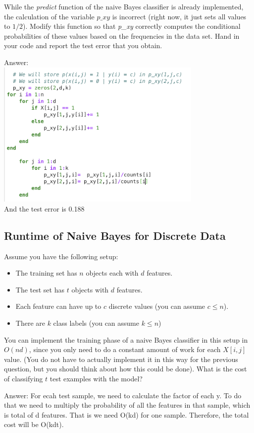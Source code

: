 \documentclass{article}
\def\ans#1{\par\gre{Answer: #1}}
\def\blu#1{{\color{blu}#1}}
\def\gre#1{{\color{gre}#1}}
\def\items#1{\begin{itemize}#1\end{itemize}}
\begin{document}
While the \emph{predict} function of the naive Bayes classifier is already implemented, the calculation of the variable $p\_xy$ is incorrect (right now, it just sets all values to $1/2$). \blu{Modify this function so that \emph{p\_xy} correctly computes the conditional probabilities of these values based on the frequencies in the data set. Hand in your code and report the test error that you obtain.}
\ans{\\ \includegraphics[width = 10cm]{Q2Code2.png}
\\
And the test error is 0.188}

\subsection{Runtime of Naive Bayes for Discrete Data}

Assume you have the following setup:
\items{
\item The training set has $n$ objects each with $d$ features.
\item The test set has $t$ objects with $d$ features.
\item Each feature can have up to $c$ discrete values (you can assume $c \leq n$).
\item There are $k$ class labels (you can assume $k \leq n$)
}
You can implement the training phase of a naive Bayes classifier in this setup in $O(nd)$, since you only need to do a constant amount of work for each $X[i,j]$ value. (You do not have to actually implement it in this way for the previous question, but you should think about how this could be done). \blu{What is the cost of classifying $t$ test examples with the model?}
\ans{
    For ecah test sample, we need to calculate the factor of each y. To do that we need to multiply the probability of all the features in that sample, which is total of d features. That is we need O(kd) for one sample. Therefore, the total cost will be O(kdt).
}
\end{document}
